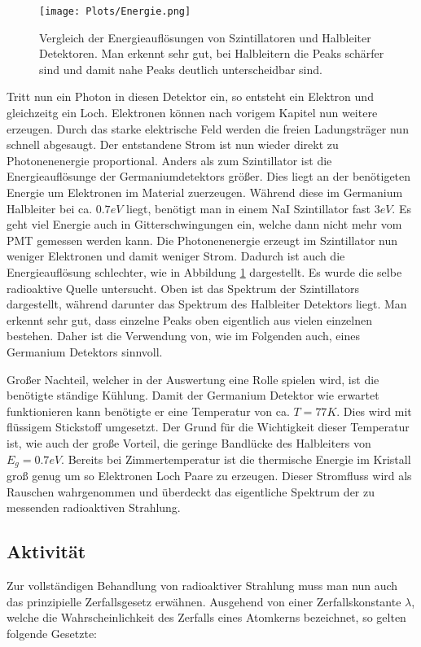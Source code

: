 \documentclass[]{article}
\begin{document}
	\begin{figure}[H]
		\centering
		\texttt{[image: Plots/Energie.png]}
		\caption{Vergleich der Energieauflösungen von Szintillatoren und Halbleiter Detektoren. Man erkennt sehr gut, bei Halbleitern die Peaks schärfer sind und damit nahe Peaks deutlich unterscheidbar sind.}
		\label{fig:energiaufloesung}
	\end{figure}
	
	Tritt nun ein Photon in diesen Detektor ein, so entsteht ein Elektron und gleichzeitg ein Loch. Elektronen können nach vorigem Kapitel nun weitere erzeugen. Durch das starke elektrische Feld werden die freien Ladungsträger nun schnell abgesaugt. Der entstandene Strom ist nun wieder direkt zu Photonenenergie proportional. Anders als zum Szintillator ist die Energieauflösunge der Germaniumdetektors größer. Dies liegt an der benötigeten Energie um Elektronen im Material zuerzeugen. Während diese im Germanium Halbleiter bei ca. $0.7eV$ liegt, benötigt man in einem NaI Szintillator fast $3eV$. \cite{energieaufloesung} Es geht viel Energie auch in Gitterschwingungen ein, welche dann nicht mehr vom PMT gemessen werden kann. Die Photonenenergie erzeugt im Szintillator nun weniger Elektronen und damit weniger Strom. Dadurch ist auch die Energieauflösung schlechter, wie in Abbildung \ref{fig:energiaufloesung} dargestellt. Es wurde die selbe radioaktive Quelle untersucht. Oben ist das Spektrum der Szintillators dargestellt, während darunter das Spektrum des Halbleiter Detektors liegt. Man erkennt sehr gut, dass einzelne Peaks oben eigentlich aus vielen einzelnen bestehen. Daher ist die Verwendung von, wie im Folgenden auch, eines Germanium Detektors sinnvoll.
	
	Großer Nachteil, welcher in der Auswertung eine Rolle spielen wird, ist die benötigte ständige Kühlung. Damit der Germanium Detektor wie erwartet funktionieren kann benötigte er eine Temperatur von ca. $T=77K$. Dies wird mit flüssigem Stickstoff umgesetzt. Der Grund für die Wichtigkeit dieser Temperatur ist, wie auch der große Vorteil, die geringe Bandlücke des Halbleiters von $E_g=0.7eV$. Bereits bei Zimmertemperatur ist die thermische Energie im Kristall groß genug um so Elektronen Loch Paare zu erzeugen. Dieser Stromfluss wird als Rauschen wahrgenommen und überdeckt das eigentliche Spektrum der zu messenden radioaktiven Strahlung.
	
	
	\subsection{Aktivität}
	Zur vollständigen Behandlung von radioaktiver Strahlung muss man nun auch das prinzipielle Zerfallsgesetz erwähnen. Ausgehend von einer Zerfallskonstante $\lambda$, welche die Wahrscheinlichkeit des Zerfalls eines Atomkerns bezeichnet, so gelten folgende Gesetzte:
	
\end{document}
